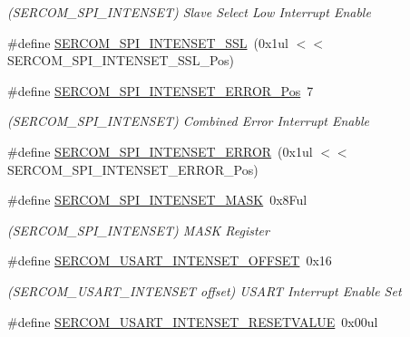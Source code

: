 \begin{DoxyCompactItemize}
\begin{DoxyCompactList}\small\item\em (S\+E\+R\+C\+O\+M\+\_\+\+S\+P\+I\+\_\+\+I\+N\+T\+E\+N\+S\+ET) Slave Select Low Interrupt Enable \end{DoxyCompactList}\item 
\#define \mbox{\hyperlink{group___s_a_m_d21___s_e_r_c_o_m_ga8923992b00c8c92d608943e2c9fb36f8}{S\+E\+R\+C\+O\+M\+\_\+\+S\+P\+I\+\_\+\+I\+N\+T\+E\+N\+S\+E\+T\+\_\+\+S\+SL}}~(0x1ul $<$$<$ S\+E\+R\+C\+O\+M\+\_\+\+S\+P\+I\+\_\+\+I\+N\+T\+E\+N\+S\+E\+T\+\_\+\+S\+S\+L\+\_\+\+Pos)
\item 
\#define \mbox{\hyperlink{group___s_a_m_d21___s_e_r_c_o_m_gab199ed093f1552871a5712af279f53c9}{S\+E\+R\+C\+O\+M\+\_\+\+S\+P\+I\+\_\+\+I\+N\+T\+E\+N\+S\+E\+T\+\_\+\+E\+R\+R\+O\+R\+\_\+\+Pos}}~7
\begin{DoxyCompactList}\small\item\em (S\+E\+R\+C\+O\+M\+\_\+\+S\+P\+I\+\_\+\+I\+N\+T\+E\+N\+S\+ET) Combined Error Interrupt Enable \end{DoxyCompactList}\item 
\#define \mbox{\hyperlink{group___s_a_m_d21___s_e_r_c_o_m_gaa353e253b3c6a7083d6aa40632915c76}{S\+E\+R\+C\+O\+M\+\_\+\+S\+P\+I\+\_\+\+I\+N\+T\+E\+N\+S\+E\+T\+\_\+\+E\+R\+R\+OR}}~(0x1ul $<$$<$ S\+E\+R\+C\+O\+M\+\_\+\+S\+P\+I\+\_\+\+I\+N\+T\+E\+N\+S\+E\+T\+\_\+\+E\+R\+R\+O\+R\+\_\+\+Pos)
\item 
\#define \mbox{\hyperlink{group___s_a_m_d21___s_e_r_c_o_m_ga13fd60e9da4dd6aaa940e9f22c7a8e94}{S\+E\+R\+C\+O\+M\+\_\+\+S\+P\+I\+\_\+\+I\+N\+T\+E\+N\+S\+E\+T\+\_\+\+M\+A\+SK}}~0x8\+Ful
\begin{DoxyCompactList}\small\item\em (S\+E\+R\+C\+O\+M\+\_\+\+S\+P\+I\+\_\+\+I\+N\+T\+E\+N\+S\+ET) M\+A\+SK Register \end{DoxyCompactList}\item 
\#define \mbox{\hyperlink{group___s_a_m_d21___s_e_r_c_o_m_ga944757514d38cdcead7f79509b898689}{S\+E\+R\+C\+O\+M\+\_\+\+U\+S\+A\+R\+T\+\_\+\+I\+N\+T\+E\+N\+S\+E\+T\+\_\+\+O\+F\+F\+S\+ET}}~0x16
\begin{DoxyCompactList}\small\item\em (S\+E\+R\+C\+O\+M\+\_\+\+U\+S\+A\+R\+T\+\_\+\+I\+N\+T\+E\+N\+S\+ET offset) U\+S\+A\+RT Interrupt Enable Set \end{DoxyCompactList}\item 
\#define \mbox{\hyperlink{group___s_a_m_d21___s_e_r_c_o_m_ga9f1c64f83d021c1cb2ed08acfd7a1039}{S\+E\+R\+C\+O\+M\+\_\+\+U\+S\+A\+R\+T\+\_\+\+I\+N\+T\+E\+N\+S\+E\+T\+\_\+\+R\+E\+S\+E\+T\+V\+A\+L\+UE}}~0x00ul

\end{DoxyCompactItemize}
